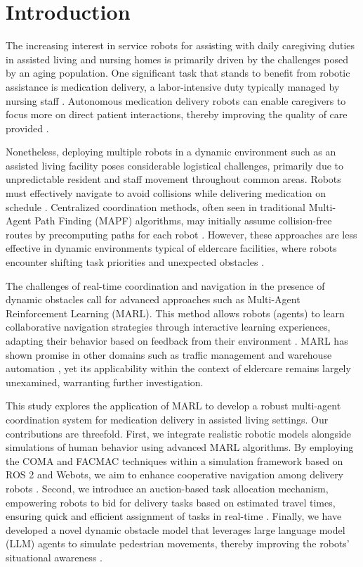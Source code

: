 \documentclass[conference]{IEEEtran}
\begin{document}
\section{Introduction}
The increasing interest in service robots for assisting with daily caregiving duties in assisted living and nursing homes is primarily driven by the challenges posed by an aging population. One significant task that stands to benefit from robotic assistance is medication delivery, a labor-intensive duty typically managed by nursing staff \citep{bao2021}. Autonomous medication delivery robots can enable caregivers to focus more on direct patient interactions, thereby improving the quality of care provided \citep{jeon2016}.

Nonetheless, deploying multiple robots in a dynamic environment such as an assisted living facility poses considerable logistical challenges, primarily due to unpredictable resident and staff movement throughout common areas. Robots must effectively navigate to avoid collisions while delivering medication on schedule \citep{song2020}. Centralized coordination methods, often seen in traditional Multi-Agent Path Finding (MAPF) algorithms, may initially assume collision-free routes by precomputing paths for each robot \citep{wang2023}. However, these approaches are less effective in dynamic environments typical of eldercare facilities, where robots encounter shifting task priorities and unexpected obstacles \citep{sharon2015}.

The challenges of real-time coordination and navigation in the presence of dynamic obstacles call for advanced approaches such as Multi-Agent Reinforcement Learning (MARL). This method allows robots (agents) to learn collaborative navigation strategies through interactive learning experiences, adapting their behavior based on feedback from their environment \citep{liu2023}. MARL has shown promise in other domains such as traffic management and warehouse automation \citep{yu2023}, yet its applicability within the context of eldercare remains largely unexamined, warranting further investigation.

This study explores the application of MARL to develop a robust multi-agent coordination system for medication delivery in assisted living settings. Our contributions are threefold. First, we integrate realistic robotic models alongside simulations of human behavior using advanced MARL algorithms. By employing the COMA and FACMAC techniques within a simulation framework based on ROS 2 and Webots, we aim to enhance cooperative navigation among delivery robots \citep{salinas2023}. Second, we introduce an auction-based task allocation mechanism, empowering robots to bid for delivery tasks based on estimated travel times, ensuring quick and efficient assignment of tasks in real-time \citep{kayy2017}. Finally, we have developed a novel dynamic obstacle model that leverages large language model (LLM) agents to simulate pedestrian movements, thereby improving the robots' situational awareness \citep{rostumi2019}.
\end{document}

